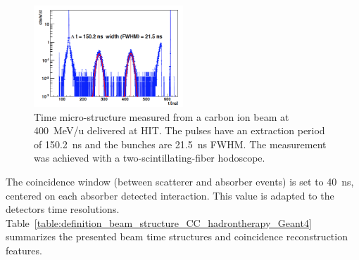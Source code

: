 	\begin{figure} [!hbtp]	
	\centering
	\includegraphics[width=0.5\textwidth]{./Figure/2013_Structure_Time_Beam_400MeV.png}
	\caption{Time micro-structure measured from a carbon ion beam at 400~MeV/u delivered at HIT. The pulses have an extraction period of 150.2~ns and the bunches are 21.5~ns FWHM. The measurement was achieved with a two-scintillating-fiber hodoscope.}
	\label{fig:fig_structure_temps_faisceau_HIT_2013_CC_simulation_Hadronth}
	\end{figure}


The coincidence window (between scatterer and absorber events) is set to 40~ns, centered on each absorber detected interaction. This value is adapted to the detectors time resolutions. Table~\ref{table:definition_beam_structure_CC_hadrontherapy_Geant4} summarizes the presented beam time structures and coincidence reconstruction features.

